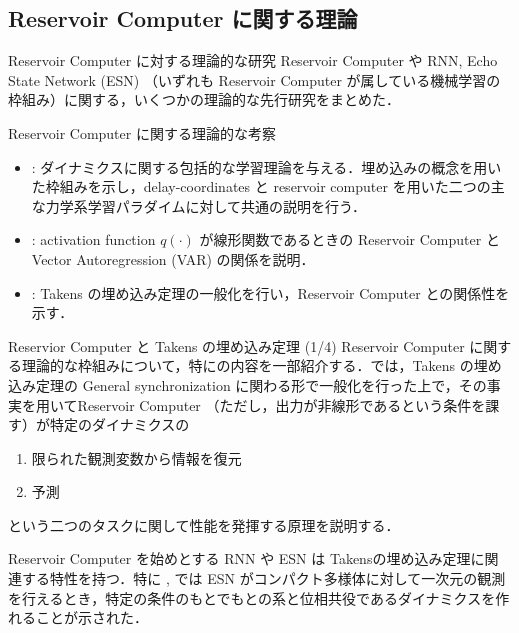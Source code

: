 \subsection{Reservoir Computer に関する理論}
\begin{frame}{Reservoir Computer に対する理論的な研究}
    Reservoir Computer や RNN, Echo State Network (ESN) （いずれも Reservoir Computer が属している機械学習の枠組み）に関する，いくつかの理論的な先行研究をまとめた．
    \begin{block}{Reservoir Computer に関する理論的な考察}
      \begin{itemize}
        \item \cite{Berry}: ダイナミクスに関する包括的な学習理論を与える．埋め込みの概念を用いた枠組みを示し，delay-coordinates と reservoir computer を用いた二つの主な力学系学習パラダイムに対して共通の説明を行う．
        \item \cite{Bollt}: activation function $q(\cdot)$ が線形関数であるときの Reservoir Computer と Vector Autoregression (VAR) の関係を説明．
        \item \cite{Gregoryeva}: Takens の埋め込み定理の一般化を行い，Reservoir Computer との関係性を示す．
      \end{itemize}
    \end{block}
\end{frame}

\begin{frame}{Reservior Computer と Takens の埋め込み定理 \cite{Gregoryeva} (1/4)}
    Reservoir Computer に関する理論的な枠組みについて，特に\cite{Gregoryeva}の内容を一部紹介する．\cite{Gregoryeva}では，Takens の埋め込み定理の General synchronization に関わる形で一般化を行った上で，その事実を用いてReservoir Computer （ただし，出力が非線形であるという条件を課す）が特定のダイナミクスの
    \begin{enumerate}
      \item 限られた観測変数から情報を復元
      \item 予測
    \end{enumerate}
    という二つのタスクに関して性能を発揮する原理を説明する．

    Reservoir Computer を始めとする RNN や ESN は Takensの埋め込み定理に関連する特性を持つ．特に \cite{Hart_1}, \cite{Hart_2} では ESN がコンパクト多様体に対して一次元の観測を行えるとき，特定の条件のもとでもとの系と位相共役であるダイナミクスを作れることが示された．
\end{frame}

